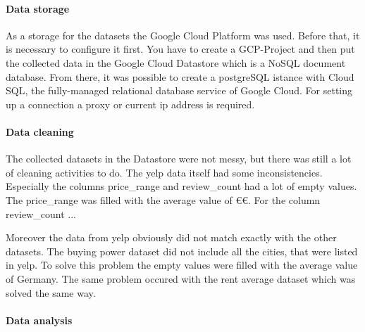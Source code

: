 \paragraph{Data storage}
\label{subsec:Data storage}
As a storage for the datasets the Google Cloud Platform was used. Before that, it is necessary to configure it first. You have to create a GCP-Project and then put the collected data in the Google Cloud Datastore which is a NoSQL document database. From there, it was possible to create a postgreSQL istance with Cloud SQL, the fully-managed relational database service of Google Cloud. For setting up a connection a proxy or current ip address is required.

\paragraph{Data cleaning}
\label{subsec:Data cleaning}
The collected datasets in the Datastore were not messy, but there was still a lot of cleaning activities to do. The yelp data itself had some inconsistencies. Especially the columns price\_range and review\_count had a lot of empty values. The price\_range was filled with the average value of \euro\euro. For the column review\_count ...%

Moreover the data from yelp obviously did not match exactly with the other datasets. The buying power dataset did not include all the cities, that were listed in yelp. To solve this problem the empty values were filled with the average value of Germany. The same problem occured with the rent average dataset which was solved the same way.

\paragraph{Data analysis}
\label{subsec:Data analysis}
